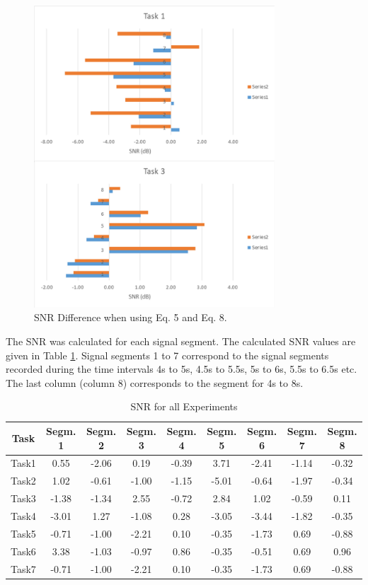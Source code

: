 \begin{figure}%
	\centering
	\includegraphics[width=9cm]{Figures/SNRchange.jpg} 
	\caption{SNR Difference when using Eq. 5 and Eq. 8.} 
	\label{SNRdiff} 
\end{figure}

The SNR was calculated for each signal segment. The calculated SNR values are given in Table \ref{SNRall}. Signal segments 1 to 7 correspond to the signal segments recorded during the time intervals 4s to 5s, 4.5s to 5.5s, 5s to 6s, 5.5s to 6.5s etc. The last column (column 8) corresponds to the segment for 4s to 8s.


\begin{table}[hbt!]
	\caption{ SNR for all Experiments}
	\label{SNRall}
	\centering
	\begin{tabular}{|c|c|c|c|c|c|c|c|c|}
	\hline
		Task & Segm. 1 & Segm. 2 & Segm. 3 & Segm. 4 & Segm. 5 & Segm. 6 & Segm. 7 & Segm. 8\\
		 \hline\hline
		Task1 &0.55 & -2.06	 &0.19 & -0.39  & 3.71 & -2.41 & -1.14 & -0.32\\
		\hline
		Task2 &1.02 & -0.61	 & -1.00 &	-1.15 & -5.01 & 	-0.64 & -1.97 & 	-0.34\\
		\hline
		Task3 & -1.38 &	 -1.34 & 2.55 & -0.72 & 2.84 & 1.02 & -0.59 & 0.11\\
		\hline
		Task4 & -3.01 &	 1.27	 & -1.08 & 0.28 & -3.05 & -3.44 & -1.82 & -0.35\\
		\hline
		Task5 & -0.71 &	 -1.00 & -2.21 & 0.10 & -0.35 & -1.73 & 0.69 & -0.88\\
		\hline
		Task6 & 3.38 &	-1.03	 & -0.97 & 0.86 & -0.35 & -0.51 & 0.69 & 0.96\\
		\hline
		Task7 &-0.71 &	-1.00 & -2.21 &	0.10 & -0.35 & -1.73 & 0.69 & -0.88\\
		 \hline
	\end{tabular}
\end{table}



